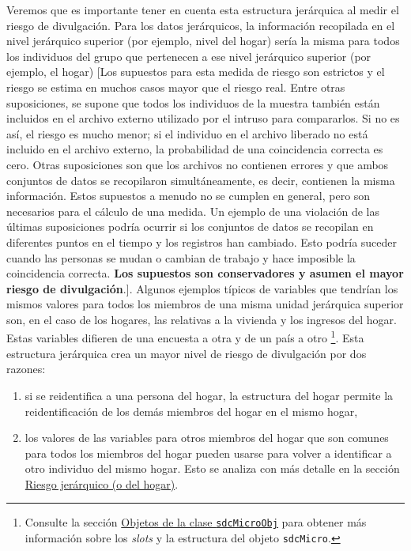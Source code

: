 \documentclass[
]{book}
\theoremstyle{definition}
\theoremstyle{definition}
\theoremstyle{definition}
\theoremstyle{definition}
\theoremstyle{remark}
\begin{document}
Veremos que es importante tener en cuenta esta estructura jerárquica al medir el riesgo de divulgación. Para los datos jerárquicos, la información recopilada en el nivel jerárquico superior (por ejemplo, nivel del hogar) sería la misma para todos los individuos del grupo que pertenecen a ese nivel jerárquico superior (por ejemplo, el hogar) {[}Los supuestos para esta medida de riesgo son estrictos y el riesgo se estima en muchos casos mayor que el riesgo real. Entre otras suposiciones, se supone que todos los individuos de la muestra también están incluidos en el archivo externo utilizado por el intruso para compararlos. Si no es así, el riesgo es mucho menor; si el individuo en el archivo liberado no está incluido en el archivo externo, la probabilidad de una coincidencia correcta es cero. Otras suposiciones son que los archivos no contienen errores y que ambos conjuntos de datos se recopilaron simultáneamente, es decir, contienen la misma información. Estos supuestos a menudo no se cumplen en general, pero son necesarios para el cálculo de una medida. Un ejemplo de una violación de las últimas suposiciones podría ocurrir si los conjuntos de datos se recopilan en diferentes puntos en el tiempo y los registros han cambiado. Esto podría suceder cuando las personas se mudan o cambian de trabajo y hace imposible la coincidencia correcta. \textbf{Los supuestos son conservadores y asumen el mayor riesgo de divulgación}.{]}. Algunos ejemplos típicos de variables que tendrían los mismos valores para todos los miembros de una misma unidad jerárquica superior son, en el caso de los hogares, las relativas a la vivienda y los ingresos del hogar. Estas variables difieren de una encuesta a otra y de un país a otro \footnote{Consulte la sección \protect\hyperlink{objetos-de-la-clase-sdcmicroobj}{Objetos de la clase \texttt{sdcMicroObj}} para obtener más información sobre los \emph{slots} y la estructura del objeto \texttt{sdcMicro}.}. Esta estructura jerárquica crea un mayor nivel de riesgo de divulgación por dos razones:

\begin{enumerate}
\def\labelenumi{\arabic{enumi}.}
\item
  si se reidentifica a una persona del hogar, la estructura del hogar permite la reidentificación de los demás miembros del hogar en el mismo hogar,
\item
  los valores de las variables para otros miembros del hogar que son comunes para todos los miembros del hogar pueden usarse para volver a identificar a otro individuo del mismo hogar. Esto se analiza con más detalle en la sección \protect\hyperlink{riesgo-jeruxe1rquico-o-del-hogar}{Riesgo jerárquico (o del hogar)}.
\end{enumerate}
\end{document}
